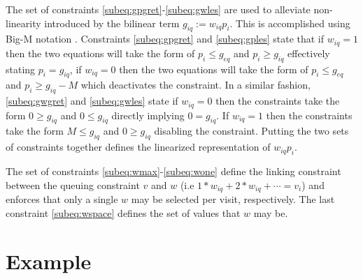 \documentclass[letterpaper, 10pt, conference]{IEEEtran}
\begin{document}
The set of constraints \eqref{subeq:gpgret}-\eqref{subeq:gwles} are used to alleviate non-linearity introduced by the bilinear term \(g_{iq} := w_{iq} p_i\). This is accomplished using Big-M notation \cite{Rodriguez2013}. Constraints \eqref{subeq:gpgret} and \eqref{subeq:gples} state that if \(w_{iq} = 1\) then the two equations will take the form of \(p_i \leq g_{eq}\) and \(p_i \geq g_{iq}\) effectively stating \(p_i = g_{iq}\), if \(w_{iq} = 0\) then the two equations will take the form of \(p_i \leq g_{eq}\) and \(p_i \geq g_{iq} - M\) which deactivates the constraint. In a similar fashion, \eqref{subeq:gwgret} and \eqref{subeq:gwles} state if \(w_{iq} = 0\) then the constraints take the form \(0 \geq g_{iq}\) and \(0 \leq g_{iq}\) directly implying \(0 = g_{iq}\). If \(w_{iq} = 1\) then the constraints take the form \(M \leq g_{iq}\) and \(0 \geq g_{iq}\) disabling the constraint. Putting the two sets of constraints together defines the linearized representation of \(w_{iq} p_i\).

The set of constraints \eqref{subeq:wmax}-\eqref{subeq:wone} define the linking constraint between the queuing constraint \(v\) and \(w\) (i.e \(1*w_{iq} + 2*w_{iq} + \cdots = v_i\)) and enforces that only a single \(w\) may be selected per visit, respectively. The last constraint \eqref{subeq:wspace} defines the set of values that \(w\) may be.
\section{Example}


%
%
%
%
%
%
\end{document}

